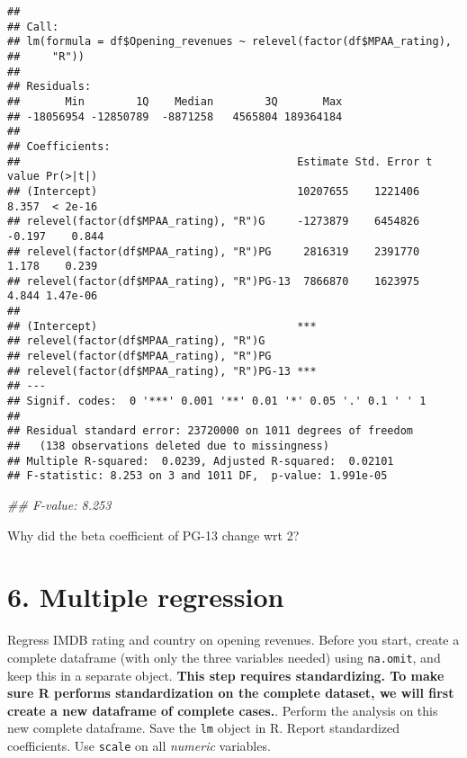 \documentclass[
]{article}
\newenvironment{Shaded}{\begin{snugshade}}{\end{snugshade}}
\newcommand{\CommentTok}[1]{\textcolor[rgb]{0.56,0.35,0.01}{\textit{#1}}}
\begin{document}
\begin{verbatim}
## 
## Call:
## lm(formula = df$Opening_revenues ~ relevel(factor(df$MPAA_rating), 
##     "R"))
## 
## Residuals:
##       Min        1Q    Median        3Q       Max 
## -18056954 -12850789  -8871258   4565804 189364184 
## 
## Coefficients:
##                                           Estimate Std. Error t value Pr(>|t|)
## (Intercept)                               10207655    1221406   8.357  < 2e-16
## relevel(factor(df$MPAA_rating), "R")G     -1273879    6454826  -0.197    0.844
## relevel(factor(df$MPAA_rating), "R")PG     2816319    2391770   1.178    0.239
## relevel(factor(df$MPAA_rating), "R")PG-13  7866870    1623975   4.844 1.47e-06
##                                              
## (Intercept)                               ***
## relevel(factor(df$MPAA_rating), "R")G        
## relevel(factor(df$MPAA_rating), "R")PG       
## relevel(factor(df$MPAA_rating), "R")PG-13 ***
## ---
## Signif. codes:  0 '***' 0.001 '**' 0.01 '*' 0.05 '.' 0.1 ' ' 1
## 
## Residual standard error: 23720000 on 1011 degrees of freedom
##   (138 observations deleted due to missingness)
## Multiple R-squared:  0.0239, Adjusted R-squared:  0.02101 
## F-statistic: 8.253 on 3 and 1011 DF,  p-value: 1.991e-05
\end{verbatim}

\begin{Shaded}
\begin{Highlighting}[]
\CommentTok{## F-value: 8.253}
\end{Highlighting}
\end{Shaded}

Why did the beta coefficient of PG-13 change wrt 2?

\hypertarget{multiple-regression}{%
\section{6. Multiple regression}\label{multiple-regression}}

Regress IMDB rating and country on opening revenues. Before you start,
create a complete dataframe (with only the three variables needed) using
\texttt{na.omit}, and keep this in a separate object. \textbf{This step
requires standardizing. To make sure R performs standardization on the
complete dataset, we will first create a new dataframe of complete
cases.}. Perform the analysis on this new complete dataframe. Save the
\texttt{lm} object in R. Report standardized coefficients. Use
\texttt{scale} on all \emph{numeric} variables.
\end{document}
